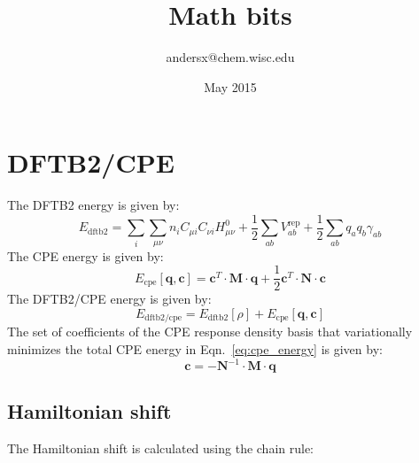 \documentclass{article}
\title{Math bits}
\author{andersx@chem.wisc.edu}
\date{May 2015}
\numberwithin{equation}{section}
\begin{document}
\section{DFTB2/CPE}
The DFTB2 energy\cite{dftb3} is given by:
\begin{equation}
    E_\mathrm{dftb2} = \sum_i \sum_{\mu\nu} n_i C_{\mu i}  C_{\nu i} H^0_{\mu\nu} + \frac{1}{2} \sum_{ab} V^\mathrm{rep}_{ab} + \frac{1}{2} \sum_{ab} q_a q_b \gamma_{ab}%
\end{equation}
The CPE energy\cite{cpekaminski} is given by:
\begin{equation}
    E_{\mathrm{cpe}}\left[\mathbf{q}, \mathbf{c}\right] = \mathbf{c}^T \cdot \mathbf{M} \cdot \mathbf{q} + \frac{1}{2} \mathbf{c}^T \cdot \mathbf{N} \cdot \mathbf{c}\label{eq:cpe_energy}
\end{equation}
The DFTB2/CPE energy is given by:
\begin{equation}
    E_\mathrm{{dftb2/cpe}} = E_\mathrm{{dftb2}}\left[ \rho \right] + E_\mathrm{{cpe}}\left[\mathbf{q}, \mathbf{c}\right]
\label{eq:dftb2cpe_energy}
\end{equation}
The set of coefficients of the CPE response density basis that variationally minimizes the total CPE energy in Eqn.~\ref{eq:cpe_energy}  is given by:
\begin{equation}
    \mathbf{c}= -\mathbf{N}^{-1} \cdot \mathbf{M} \cdot \mathbf{q}
\end{equation}
\subsection{Hamiltonian shift}
The Hamiltonian shift is calculated using the chain rule:
\end{document}

